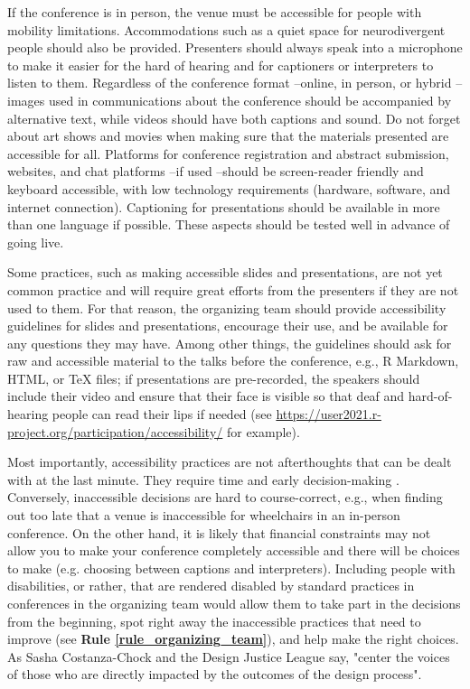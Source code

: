 \documentclass[10pt,letterpaper]{article}
\begin{document}
If the conference is in person, the venue must be accessible for people with mobility limitations. 
Accommodations such as a quiet space for neurodivergent people should also be provided.
Presenters should always speak into a microphone to make it easier for the hard of hearing and for captioners or interpreters to listen to them. 
Regardless of the conference format --online, in person, or hybrid --images used in communications about the conference should be accompanied by alternative text, while videos should have both captions and sound. Do not forget about art shows and movies when making sure that the materials presented are accessible for all. 
Platforms for conference registration and abstract submission, websites, and chat platforms --if used --should be screen-reader friendly and keyboard accessible, with low technology requirements (hardware, software, and internet connection). 
Captioning for presentations should be available in more than one language if possible.
These aspects should be tested well in advance of going live.  

Some practices, such as making accessible slides and presentations, are not yet common practice and will require great efforts from the presenters if they are not used to them. 
For that reason, the organizing team should provide accessibility guidelines for slides and presentations, encourage their use, and be available for any questions they may have.  
Among other things, the guidelines should ask for raw and accessible material to the talks before the conference, e.g., R Markdown, HTML, or \TeX{} files; if presentations are pre-recorded, the speakers should include their video and ensure that their face is visible so that deaf and hard-of-hearing people can read their lips if needed (see \url{https://user2021.r-project.org/participation/accessibility/} for example). 

Most importantly, accessibility practices are not afterthoughts that can be dealt with at the last minute. 
They require time and early decision-making \cite{irishIncreasingParticipationUsing2020}. 
Conversely, inaccessible decisions are hard to course-correct, e.g., when finding out too late that a venue is inaccessible for wheelchairs in an in-person conference. 
On the other hand, it is likely that financial constraints may not allow you to make your conference completely accessible and there will be choices to make (e.g. choosing between captions and interpreters). 
Including people with disabilities, or rather, that are rendered disabled by standard practices in conferences in the organizing team would allow them to take part in the decisions from the beginning, spot right away the inaccessible practices that need to improve (see \textbf{Rule \ref{rule_organizing_team}}), and help make the right choices. As Sasha Costanza-Chock and the Design Justice League say, "center the voices of those who are directly impacted by the outcomes of the design process".  
\end{document}
